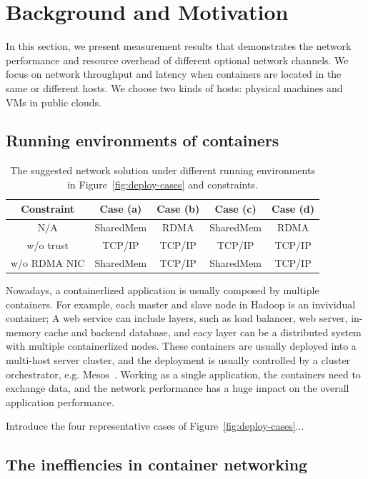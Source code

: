 \section{Background and Motivation}
\label{sec:motivation}

In this section, we present measurement results that demonstrates the network performance and resource overhead of different optional network channels. We focus on network throughput and latency when containers are located in the same or different hosts. 
We choose two kinds of hosts: physical machines and VMs in public clouds.

\subsection{Running environments of containers}

\begin{table} [t!]
\centering
\small
\begin{tabular}{ c || c | c | c | c }
  \hline
  Constraint & Case (a) & Case (b) & Case (c) & Case (d) \\ \hline \hline
  N/A & SharedMem & RDMA & SharedMem & RDMA \\ \hline
  w/o trust & TCP/IP & TCP/IP & TCP/IP & TCP/IP \\ \hline
  w/o RDMA NIC & SharedMem & TCP/IP & SharedMem & TCP/IP \\ \hline
\end{tabular}
\caption{\label{tab:best-network} The suggested network solution under different running environments in Figure~\ref{fig:deploy-cases} and constraints.}
\normalsize
\end{table}

Nowadays, a containerlized application is usually composed by multiple containers. For example, each master and slave node in Hadoop is an invividual container; A web service can include layers, such as load balancer, web server,
in-memory cache and backend database, and eacy layer can be a distributed 
system with multiple containerlized nodes. These containers are usually 
deployed into a multi-host server cluster, and the deployment is usually 
controlled by a cluster orchestrator, e.g. Mesos~\cite{?}. Working as a single 
application, the containers need to exchange data, and the network performance
has a huge impact on the overall application performance. 

Introduce the four representative cases of Figure~\ref{fig:deploy-cases}...

\subsection{The ineffiencies in container networking}


